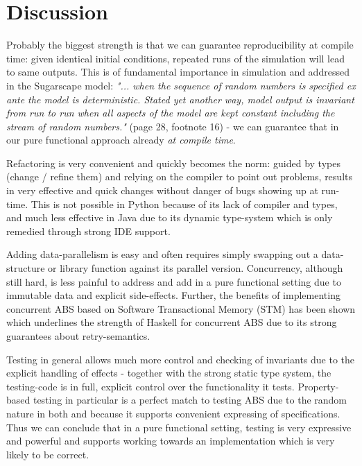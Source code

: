 \section{Discussion}
\label{sec:discussion}
Probably the biggest strength is that we can guarantee reproducibility at compile time: given identical initial conditions, repeated runs of the simulation will lead to same outputs. This is of fundamental importance in simulation and addressed in the Sugarscape model: \textit{"... when the sequence of random numbers is specified ex ante the model is deterministic. Stated yet another way, model output is invariant from run to run when all aspects of the model are kept constant including the stream of random numbers."} (page 28, footnote 16) - we can guarantee that in our pure functional approach already \textit{at compile time}.

Refactoring is very convenient and quickly becomes the norm: guided by types (change / refine them) and relying on the compiler to point out problems, results in very effective and quick changes without danger of bugs showing up at run-time. This is not possible in Python because of its lack of compiler and types, and much less effective in Java due to its dynamic type-system which is only remedied through strong IDE support.

Adding data-parallelism is easy and often requires simply swapping out a data-structure or library function against its parallel version. Concurrency, although still hard, is less painful to address and add in a pure functional setting due to immutable data and explicit side-effects. Further, the benefits of implementing concurrent ABS based on Software Transactional Memory (STM) has been shown \cite{thaler_tale_2018} which underlines the strength of Haskell for concurrent ABS due to its strong guarantees about retry-semantics.

Testing in general allows much more control and checking of invariants due to the explicit handling of effects - together with the strong static type system, the testing-code is in full, explicit control over the functionality it tests. Property-based testing in particular is a perfect match to testing ABS due to the random nature in both and because it supports convenient expressing of specifications. Thus we can conclude that in a pure functional setting, testing is very expressive and powerful and supports working towards an implementation which is very likely to be correct.

